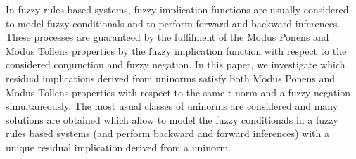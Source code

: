 
In fuzzy rules based systems, fuzzy implication functions are usually considered to model fuzzy conditionals and to perform forward and backward inferences. These processes are guaranteed by the fulfilment of the Modus Ponens and Modus Tollens properties by the fuzzy implication function with respect to the considered conjunction and fuzzy negation. In this paper, we investigate which residual implications derived from uninorms satisfy both Modus Ponens and Modus Tollens properties with respect to the same t-norm and a fuzzy negation simultaneously. The most usual classes of uninorms are considered and many solutions are obtained which allow to model the fuzzy conditionals in a fuzzy rules based systems (and perform backward and forward inferences) with a unique residual implication derived from a uninorm.  

